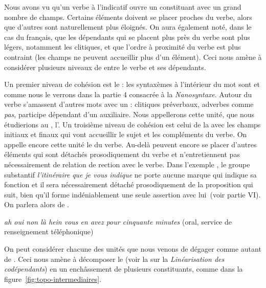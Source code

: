 Nous avons vu qu’un verbe à l’indicatif ouvre un constituant avec un grand nombre de champs. Certains éléments doivent se placer proches du verbe, alors que d’autres sont naturellement plus éloignés. On aura également noté, dans le cas du français, que les dépendants qui se placent plus près du verbe sont plus légers, notamment les clitiques, et que l’ordre à proximité du verbe est plus contraint (les champs ne peuvent accueillir plus d’un élément). Ceci nous amène à considérer plusieurs niveaux de  entre le verbe et ses dépendants.

Un premier niveau de cohésion est le  : les syntaxèmes à l’intérieur du mot sont  et  comme nous le verrons dans la partie 4 consacrée à la \textit{Nanosyntaxe}. Autour du verbe s’amassent d’autres mots avec un : clitiques préverbaux, adverbes comme \textit{pas}, participe dépendant d’un auxiliaire. Nous appellerons cette unité, que nous étudierions au , l’. Un troisième niveau de cohésion est celui de la  avec les champs initiaux et finaux qui vont accueillir le sujet et les compléments du verbe. On appelle encore cette unité le  du verbe. Au-delà peuvent encore se placer d’autres éléments qui sont détachés prosodiquement du verbe et n’entretiennent pas nécessairement de relation de rection avec le verbe. Dans l’exemple , le groupe substantif \textit{l’itinéraire} \textit{que je vous indique} ne porte aucune marque qui indique sa fonction et il sera nécessairement détaché prosodiquement de la proposition qui suit, bien qu’il forme indéniablement une seule assertion avec lui~(voir partie VI). On parlera alors de .

\ea\label{ex:ratp}
{\itshape
 ah oui non là   {hein vous en avez pour cinquante minutes}} (oral, service de renseignement téléphonique)
\z

On peut considérer chacune des unités que nous venons de dégager comme autant de . Ceci nous amène à décomposer le  (voir la  sur la \textit{Linéarisation des codépendants}) en un enchâssement de plusieurs constituants, comme dans la figure~\ref{fig:topo-intermediaires}.

